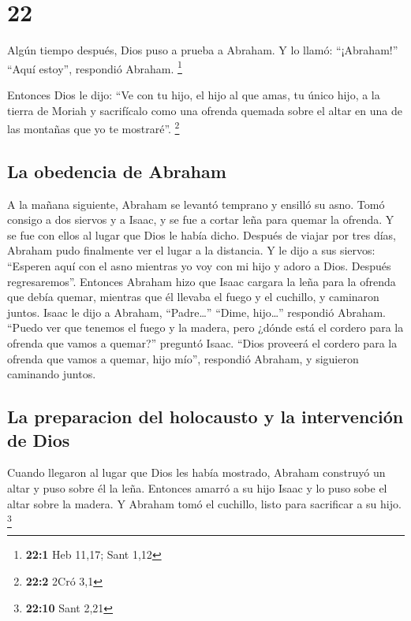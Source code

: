 \hypertarget{section-21}{%
\section{22}\label{section-21}}

 Algún tiempo después, Dios puso a prueba a Abraham. Y lo
llamó: ``¡Abraham!'' ``Aquí estoy'', respondió Abraham. \footnote{\textbf{22:1}
  Heb 11,17; Sant 1,12}

 Entonces Dios le dijo: ``Ve con tu hijo, el hijo al que
amas, tu único hijo, a la tierra de Moriah y sacrifícalo como una
ofrenda quemada sobre el altar en una de las montañas que yo te
mostraré''. \footnote{\textbf{22:2} 2Cró 3,1}

\hypertarget{la-obedencia-de-abraham}{%
\subsection{La obedencia de Abraham}\label{la-obedencia-de-abraham}}

 A la mañana siguiente, Abraham se levantó temprano y
ensilló su asno. Tomó consigo a dos siervos y a Isaac, y se fue a cortar
leña para quemar la ofrenda. Y se fue con ellos al lugar que Dios le
había dicho.  Después de viajar por tres días, Abraham
pudo finalmente ver el lugar a la distancia.  Y le dijo a
sus siervos: ``Esperen aquí con el asno mientras yo voy con mi hijo y
adoro a Dios. Después regresaremos''.  Entonces Abraham
hizo que Isaac cargara la leña para la ofrenda que debía quemar,
mientras que él llevaba el fuego y el cuchillo, y caminaron juntos.
 Isaac le dijo a Abraham, ``Padre\ldots{}'' ``Dime,
hijo\ldots{}'' respondió Abraham. ``Puedo ver que tenemos el fuego y la
madera, pero ¿dónde está el cordero para la ofrenda que vamos a
quemar?'' preguntó Isaac.  ``Dios proveerá el cordero para
la ofrenda que vamos a quemar, hijo mío'', respondió Abraham, y
siguieron caminando juntos.

\hypertarget{la-preparacion-del-holocausto-y-la-intervenciuxf3n-de-dios}{%
\subsection{La preparacion del holocausto y la intervención de
Dios}\label{la-preparacion-del-holocausto-y-la-intervenciuxf3n-de-dios}}

 Cuando llegaron al lugar que Dios les había mostrado,
Abraham construyó un altar y puso sobre él la leña. Entonces amarró a su
hijo Isaac y lo puso sobe el altar sobre la madera.  Y
Abraham tomó el cuchillo, listo para sacrificar a su hijo. \footnote{\textbf{22:10}
  Sant 2,21}

